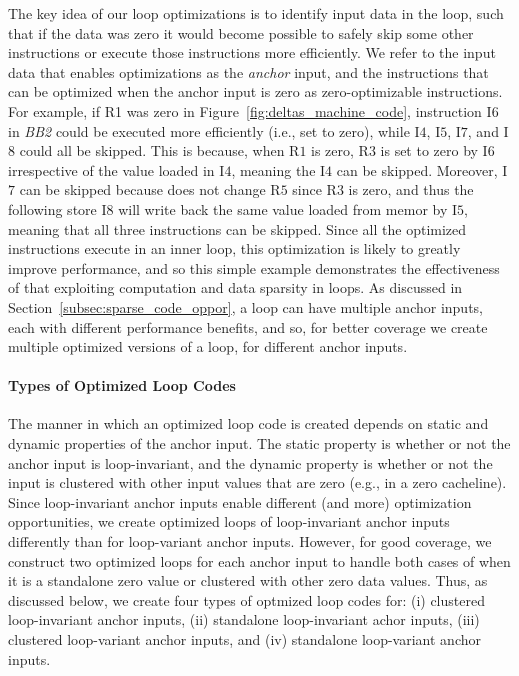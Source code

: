 The key idea of our loop optimizations is to identify input data in the loop, such that if the data was zero it would become possible to safely skip some other instructions or execute those instructions more efficiently.   We refer to the input data that enables optimizations as the {\em anchor} input, and the instructions that can be optimized when the anchor input is zero as zero-optimizable instructions.  For example, if R1 was zero in Figure~\ref{fig:deltas_machine_code}, instruction I$6$ in {\it BB2} could be executed more efficiently (i.e., set to zero), while I$4$, I$5$, I$7$, and I$8$ could all be skipped.  This is because, when R$1$ is zero, R$3$ is set to zero by I$6$ irrespective of the value loaded in I$4$, meaning the I$4$ can be skipped.  Moreover, I$7$ can be skipped because does not change R$5$ since R$3$ is zero, and thus the following store I$8$ will write back the same value loaded from memor by I$5$, meaning that all three instructions can be skipped.  Since all the optimized instructions execute in an inner loop, this optimization is likely to greatly improve performance, and so this simple example demonstrates the effectiveness of that exploiting computation and data sparsity in loops.  As discussed in Section~\ref{subsec:sparse_code_oppor}, a loop can have multiple anchor inputs, each with different performance benefits, and so, for better coverage we create multiple optimized versions of a loop, for different anchor inputs.  

\paragraph{Types of Optimized Loop Codes}
The manner in which an optimized loop code is created depends on static and dynamic properties of the anchor input.  The static property is whether or not the anchor input is loop-invariant, and the dynamic property is whether or not the input is clustered with other input values that are zero (e.g., in a zero cacheline).   Since loop-invariant anchor inputs enable different (and more) optimization opportunities, we create optimized loops of loop-invariant anchor inputs differently than for loop-variant anchor inputs.  However, for good coverage, we construct two optimized loops for each anchor input to handle both cases of when it is a standalone zero value or clustered with other zero data values.   Thus, as discussed below, we create four types of optmized loop codes for: (i)  clustered loop-invariant anchor inputs, (ii) standalone loop-invariant achor inputs, (iii) clustered loop-variant anchor inputs, and (iv) standalone loop-variant anchor inputs.  
 
